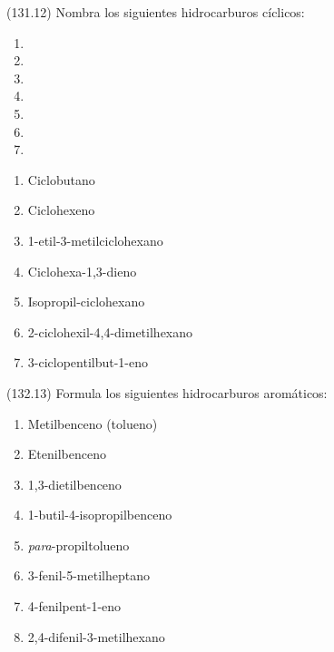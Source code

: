   \begin{exercise}[
      tags    = {},
      topics  = {química, química orgánica, orgánica},
      source  = {FQ 1B MGH 2016, p131, e12},
    ]
    (131.12) Nombra los siguientes hidrocarburos cíclicos:
    \begin{enumerate}
      \item {}
      \item {}
      \item {}
      \item {}
      \item {}
      \item {}
      \item {}
    \end{enumerate}
  \end{exercise}

  \begin{solution}
    \begin{enumerate}
      \item Ciclobutano
      \item Ciclohexeno
      \item 1-etil-3-metilciclohexano
      \item Ciclohexa-1,3-dieno
      \item Isopropil-ciclohexano
      \item 2-ciclohexil-4,4-dimetilhexano
      \item 3-ciclopentilbut-1-eno
    \end{enumerate}
  \end{solution}




  \begin{exercise}[
      tags    = {},
      topics  = {química, química orgánica, orgánica},
      source  = {FQ 1B MGH 2016, p132, e13},
    ]
    (132.13) Formula los siguientes hidrocarburos aromáticos:
    \begin{enumerate}
      \item Metilbenceno (tolueno)
      \item Etenilbenceno
      \item 1,3-dietilbenceno
      \item 1-butil-4-isopropilbenceno
      \item \textit{para}-propiltolueno
      \item 3-fenil-5-metilheptano
      \item 4-fenilpent-1-eno
      \item 2,4-difenil-3-metilhexano
    \end{enumerate}
  \end{exercise}

